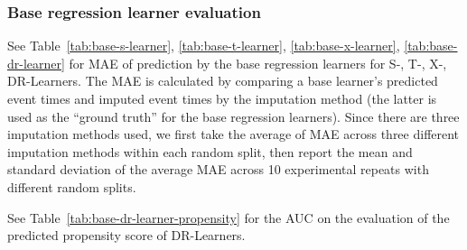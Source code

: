 \documentclass{article} %
\begin{document}
\subsubsection{Base regression learner evaluation} \label{subapp:base-reg-eval}
See Table~\ref{tab:base-s-learner}, \ref{tab:base-t-learner}, \ref{tab:base-x-learner}, \ref{tab:base-dr-learner} for MAE of prediction by the base regression learners for S-, T-, X-, DR-Learners. The MAE is calculated by comparing a base learner's predicted event times and imputed event times by the imputation method (the latter is used as the ``ground truth'' for the base regression learners). Since there are three imputation methods used, we first take the average of MAE across three different imputation methods within each random split, then report the mean and standard deviation of the average MAE across 10 experimental repeats with different random splits. 

See Table~\ref{tab:base-dr-learner-propensity} for the AUC on the evaluation of the predicted propensity score of DR-Learners.
\end{document}
